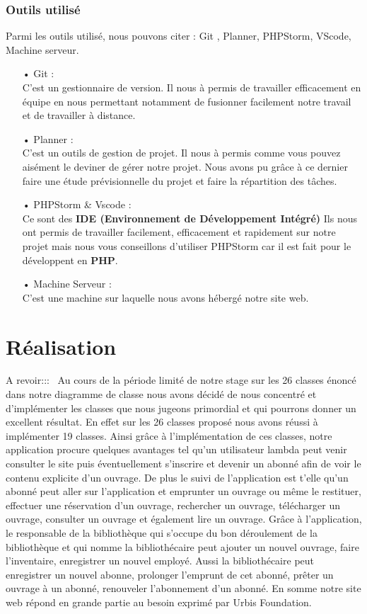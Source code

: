 \documentclass[12pt,a4paper]{article}
\begin{document}
\subsubsection{Outils utilisé}
Parmi les outils utilisé, nous pouvons citer : Git , Planner, PHPStorm, VScode, Machine serveur.
\begin{itemize}
\item[•] Git : \\
C'est un gestionnaire de version. Il nous à permis de travailler efficacement en équipe en nous
permettant notamment de fusionner facilement notre travail et de travailler à distance. 
\item[•] Planner : \\
C'est un outils de gestion de projet. Il nous à permis comme vous pouvez aisément le deviner de 
gérer notre projet. Nous avons pu grâce à ce dernier faire une étude prévisionnelle du projet et faire
la répartition des tâches.
\item[•] PHPStorm \& Vscode : \\
Ce sont des \textbf{IDE (Environnement de Développement Intégré)} Ils nous ont permis de
travailler facilement, efficacement et rapidement sur notre projet mais nous vous conseillons 
d'utiliser PHPStorm car il est fait pour le développent en \textbf{PHP}.
\item[•] Machine Serveur : \\
C'est une machine sur laquelle nous avons hébergé notre site web.
\end{itemize}

\section{Réalisation}
A revoir:::
\ Au cours de la période limité de notre stage sur les 26 classes énoncé dans notre diagramme de classe nous avons décidé de nous concentré et d'implémenter les classes que nous jugeons primordial et qui pourrons donner un excellent résultat. En effet sur les 26 classes proposé nous avons réussi à implémenter 19 classes. Ainsi grâce à l'implémentation de ces classes, notre application procure quelques avantages tel qu'un utilisateur lambda peut venir consulter le site puis éventuellement s'inscrire et devenir un abonné afin de voir le contenu explicite d'un ouvrage. De plus le suivi de l'application est t'elle qu'un abonné peut aller sur l'application et emprunter un ouvrage ou même le restituer, effectuer une réservation d'un ouvrage, rechercher un ouvrage, télécharger un ouvrage, consulter un ouvrage et également lire un ouvrage. Grâce à l'application, le responsable de la bibliothèque qui s'occupe du bon déroulement de la bibliothèque et qui nomme la bibliothécaire peut ajouter un nouvel ouvrage, faire l'inventaire, enregistrer un nouvel employé. Aussi la bibliothécaire peut enregistrer un nouvel abonne, prolonger l'emprunt de cet abonné, prêter un ouvrage à un abonné, renouveler l'abonnement d'un abonné. En somme notre site web répond en grande partie au besoin exprimé par Urbis Foundation.
\end{document}
